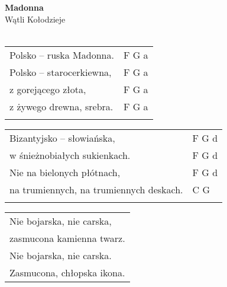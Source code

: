 \documentclass[a5paper]{article}
\begin{document}


\noindent
\fontsize{12pt}{15pt}\selectfont
\textbf{Madonna} \\
\fontsize{8pt}{10pt}\selectfont
Wątli Kołodzieje \\ \\
\fontsize{10pt}{12pt}\selectfont
{}
\begin{tabular}{@{}p{8.00cm}p{3cm}@{}}
\noindent
Polsko – ruska Madonna. & F G a \\
Polsko – starocerkiewna, & F G a \\
z gorejącego złota, & F G a \\
z żywego drewna, srebra. & F G a \\ \\
\end{tabular}

\noindent
\begin{tabular}{@{}p{8.00cm}p{3cm}@{}}
Bizantyjsko – słowiańska, & F G d \\
w śnieżnobiałych sukienkach. & F G d \\
Nie na bielonych płótnach, & F G d \\
na trumiennych, na trumiennych deskach. & C G \\ \\
\end{tabular}

\noindent
\begin{tabular}{@{}p{8.00cm}@{}}
Nie bojarska, nie carska, \\
zasmucona kamienna twarz. \\
Nie bojarska, nie carska. \\
Zasmucona, chłopska ikona.
\end{tabular}
\end{document}
